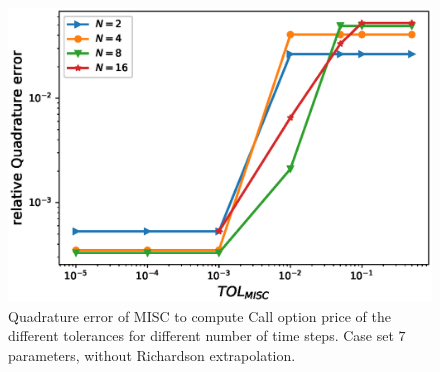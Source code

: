 \documentclass[11pt]{article}
\begin{document}
\begin{figure}[h!]
	\centering
	\includegraphics[width=0.7\linewidth]{./figures/rBergomi_MISC_quadratre_error/vs_TOL/set7/relative_quad_error_wrt_MISC_TOL_set7_non_rich}
	
	
	\caption{Quadrature error of MISC to compute Call option price of the different tolerances for different number of time steps. Case  set $7$ parameters, without Richardson extrapolation.}
	\label{fig:Quadrature_error_set7}
\end{figure}
\end{document}
